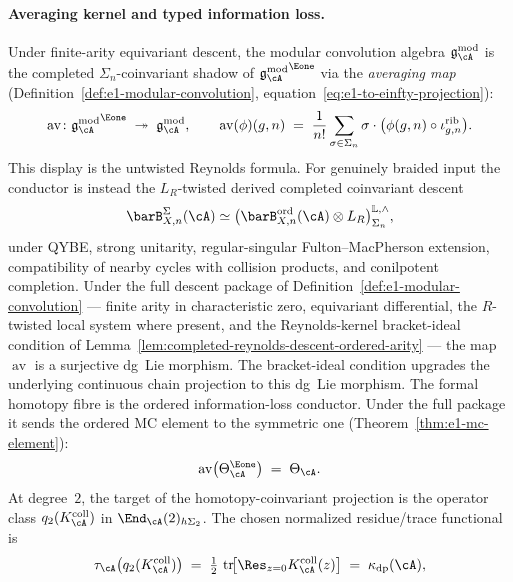 \paragraph{Averaging kernel and typed information loss.}
Under finite-arity equivariant descent, the modular convolution algebra
$\gAmod$ is the completed $\Sigma_n$-coinvariant shadow of
${\gAmod}^{\Eone}$ via the \emph{averaging map}
(Definition~\ref{def:e1-modular-convolution},
equation~\eqref{eq:e1-to-einfty-projection}):
\begin{equation}\label{eq:intro-averaging}
\operatorname{av}\colon
{\gAmod}^{\Eone}
\;\twoheadrightarrow\;
\gAmod,
\qquad
\operatorname{av}(\phi)(g, n)
\;=\;
\frac{1}{n!}\sum_{\sigma \in \Sigma_n} \sigma\cdot
\bigl(\phi(g, n) \circ \iota^{\mathrm{rib}}_{g,n}\bigr).
\end{equation}
This display is the untwisted Reynolds formula. For genuinely braided
input the conductor is instead the $L_R$-twisted derived completed
coinvariant descent
\[
\barB^\Sigma_{X,n}(\cA)
\simeq
\bigl(\barB^{\mathrm{ord}}_{X,n}(\cA)\otimes L_R\bigr)
^{\mathbb L,\wedge}_{\Sigma_n},
\]
under QYBE, strong unitarity, regular-singular Fulton--MacPherson
extension, compatibility of nearby cycles with collision products, and
conilpotent completion. Under the full descent package of
Definition~\ref{def:e1-modular-convolution} --- finite arity in
characteristic zero, equivariant differential, the $R$-twisted local
system where present, and the Reynolds-kernel bracket-ideal condition
of Lemma~\ref{lem:completed-reynolds-descent-ordered-arity} --- the
map $\operatorname{av}$ is a surjective dg~Lie morphism. The
bracket-ideal condition upgrades the underlying continuous chain
projection to this dg~Lie morphism. The formal homotopy fibre is the ordered
information-loss conductor. Under the full package it sends the ordered
MC element to the symmetric one
(Theorem~\ref{thm:e1-mc-element}):
\begin{equation}\label{eq:intro-av-theta}
\operatorname{av}\bigl(\Theta_\cA^{\Eone}\bigr)
\;=\;
\Theta_\cA.
\end{equation}
At degree~$2$, the target of the homotopy-coinvariant projection is
the operator class $q_2(K_\cA^{\mathrm{coll}})$ in
$\End_\cA(2)_{h\Sigma_2}$.  The chosen normalized residue/trace
functional is
\begin{equation}\label{eq:intro-kappa-from-r}
\tau_\cA\!\left(q_2(K_\cA^{\mathrm{coll}})\right)
\;=\;
\tfrac{1}{2}\,\operatorname{tr}\!\bigl[
 \Res_{z = 0}K_\cA^{\mathrm{coll}}(z)\bigr]
\;=\;\kappa_{\mathrm{dp}}(\cA),
\end{equation}
